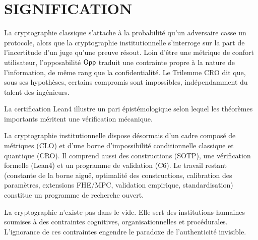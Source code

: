 \section{SIGNIFICATION}
\label{sec:cg_signification}
\begin{sloppypar}

La cryptographie classique s'attache \`a la probabilit\'e qu'un
adversaire casse un protocole, alors que la cryptographie institutionnelle
s'interroge sur la part de l'incertitude d'un juge qu'une
preuve r\'esout. Loin d'\^etre une m\'etrique de confort
utilisateur, l'opposabilit\'e $\mathsf{Opp}$ traduit une contrainte propre \`a la nature de l'information,
de m\^eme rang que la confidentialit\'e. Le Trilemme CRO dit que,
sous ses hypoth\`eses, certains compromis sont impossibles, ind\'ependamment
du talent des ing\'enieurs.

La certification Lean4 illustre un pari \'epist\'emologique selon lequel les
th\'eor\`emes importants m\'eritent une v\'erification m\'ecanique.

La cryptographie institutionnelle dispose d\'esormais d'un cadre
compos\'e de m\'etriques (CLO) et d'une borne d'impossibilit\'e conditionnelle classique et
quantique (CRO). Il comprend aussi des constructions (SOTP), une v\'erification formelle (Lean4)
et un programme de validation (C6). Le travail restant (constante de la borne aigu\"e,
optimalit\'e des constructions, calibration des param\`etres,
extensions FHE/MPC, validation empirique, standardisation) constitue un
programme de recherche ouvert.

La cryptographie n'existe pas dans le vide. Elle sert
des institutions humaines soumises \`a des contraintes cognitives,
organisationnelles et proc\'edurales. L'ignorance de ces
contraintes engendre le paradoxe de l'authenticit\'e invisible.

\end{sloppypar}

